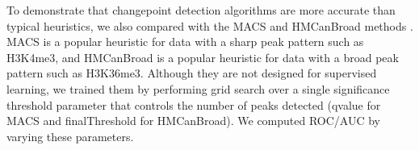 \documentclass[twoside,11pt]{article}
\begin{document}
To demonstrate that changepoint detection algorithms are more accurate
than typical heuristics, we also
compared with the MACS and HMCanBroad methods \citep{MACS,
  HMCan}. MACS is a popular heuristic for data with a sharp peak
pattern such as H3K4me3, and \mbox{HMCanBroad} is a popular heuristic
for data with a broad peak pattern such as H3K36me3. Although they are
not designed for supervised learning, we trained them by performing
grid search over a single significance threshold parameter that
controls the number of peaks detected (qvalue for MACS and
finalThreshold for HMCanBroad). We computed ROC/AUC by varying these
parameters.
\end{document}
